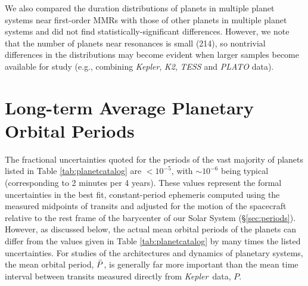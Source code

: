 \documentclass{aastex62}
\newcommand{\ikt}{{\it Kepler}}
\newcommand{\ik}{{\it Kepler~}}
\begin{document}
We also compared the duration distributions of planets in multiple planet systems near first-order MMRs with those of other planets in multiple planet systems and did not find statistically-significant differences. 
However, we note that the number of planets near resonances is small (214), so nontrivial differences in the distributions may become evident when larger samples become available for study (e.g., combining \ikt, {\it K2}, {\it TESS} and {\it PLATO} data).  




\newpage
\section{Long-term Average Planetary Orbital Periods}\label{sec:periodtheory}

The fractional uncertainties quoted for the periods of the vast majority of planets listed in Table \ref{tab:planetcatalog} are $<10^{-5}$, with $\sim 10^{-6}$ being typical (corresponding to 2 minutes per 4 years). These values represent the formal uncertainties in the best fit, constant-period ephemeris computed using the measured midpoints of transits and adjusted for the motion of the spacecraft relative to the rest frame of the barycenter of our Solar System (\S\ref{sec:periods}).  However, as discussed below, the actual mean orbital periods of the planets can differ from the values given in Table \ref{tab:planetcatalog} by many times the listed uncertainties. For studies of the architectures and dynamics of planetary systems, the mean orbital period, $\Bar{P}$, is generally far more important than the mean time interval between transits measured directly from \ik data, $P$. 
\end{document}
